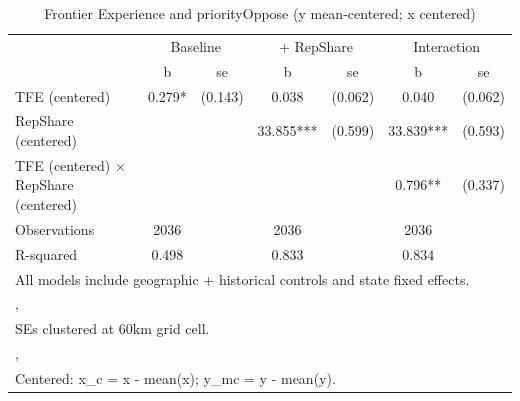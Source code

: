 \begin{table}[htbp]\centering
\def\sym#1{\ifmmode^{#1}\else\(^{#1}\)\fi}
\caption{Frontier Experience and priorityOppose (y mean-centered; x centered)}
\begin{tabular}{l*{3}{cc}}
\toprule
                &\multicolumn{2}{c}{Baseline}&\multicolumn{2}{c}{ + RepShare}&\multicolumn{2}{c}{Interaction}\\
                &        b   &       se&        b   &       se&        b   &       se\\
\midrule
TFE (centered)  &    0.279*  &  (0.143)&    0.038   &  (0.062)&    0.040   &  (0.062)\\
RepShare (centered)&            &         &   33.855***&  (0.599)&   33.839***&  (0.593)\\
TFE (centered) $\times$ RepShare (centered)&            &         &            &         &    0.796** &  (0.337)\\
\midrule
Observations    &     2036   &         &     2036   &         &     2036   &         \\
R-squared       &    0.498   &         &    0.833   &         &    0.834   &         \\
\bottomrule
\multicolumn{7}{l}{\footnotesize All models include geographic + historical controls and state fixed effects.}\\
\multicolumn{7}{l}{\footnotesize ,}\\
\multicolumn{7}{l}{\footnotesize SEs clustered at 60km grid cell.}\\
\multicolumn{7}{l}{\footnotesize ,}\\
\multicolumn{7}{l}{\footnotesize Centered: x\_c = x - mean(x); y\_mc = y - mean(y).}\\
\end{tabular}
\end{table}
